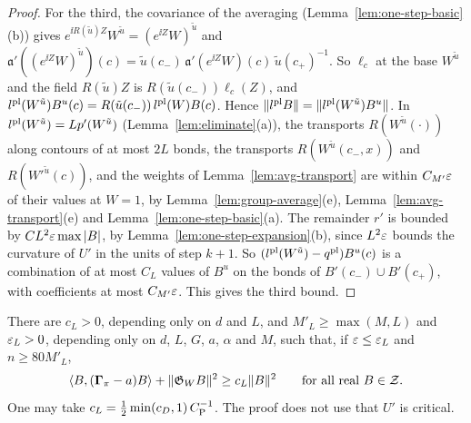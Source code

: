 \begin{proof}
For the third, the covariance of the averaging (Lemma~\ref{lem:one-step-basic}(b)) gives $e^{\ii R(\tilde u)Z}W^{\tilde u}=(e^{\ii Z}W)^{\tilde u}$ and $\mathfrak a'((e^{\ii Z}W)^{\tilde u})(c)=\tilde u(c_-)\,\mathfrak a'(e^{\ii Z}W)(c)\,\tilde u(c_+)^{-1}$. So $\ell_c$ at the base $W^{\tilde u}$ and the field $R(\tilde u)Z$ is $R(\tilde u(c_-))\ell_c(Z)$, and $l^{\rm pl}(W^{\tilde u})B^u(c)=R(\tilde u(c_-))\,l^{\rm pl}(W)B(c)$. Hence $\|l^{\rm pl}B\|=\|l^{\rm pl}(W^{\tilde u})B^u\|$. In $l^{\rm pl}(W^{\tilde u})=Lp'(W^{\tilde u})$ (Lemma~\ref{lem:eliminate}(a)), the transports $R(W^{\tilde u}(\cdot))$ along contours of at most $2L$ bonds, the transports $R(W^{\tilde u}(c_-,x))$ and $R(W'^{\tilde u}(c))$, and the weights of Lemma~\ref{lem:avg-transport} are within $C_{M'}\varepsilon$ of their values at $W=1$, by Lemma~\ref{lem:group-average}(e), Lemma~\ref{lem:avg-transport}(e) and Lemma~\ref{lem:one-step-basic}(a). The remainder $r'$ is bounded by $CL^2\varepsilon\max|B|$, by Lemma~\ref{lem:one-step-expansion}(b), since $L^2\varepsilon$ bounds the curvature of $U'$ in the units of step $k+1$. So $(l^{\rm pl}(W^{\tilde u})-q^{\rm pl})B^u(c)$ is a combination of at most $C_L$ values of $B^u$ on the bonds of $B'(c_-)\cup B'(c_+)$, with coefficients at most $C_{M'}\varepsilon$. This gives the third bound.
\end{proof}

\begin{theorem}\label{thm:step-coercive}
There are $c_L>0$, depending only on $d$ and $L$, and $M'_L\ge\max(M,L)$ and $\varepsilon_L>0$, depending only on $d$, $L$, $G$, $a$, $\alpha$ and $M$, such that, if $\varepsilon\le\varepsilon_L$ and $n\ge80M'_L$,
\[
\langle B,(\boldsymbol\Gamma_\pi-a)B\rangle+\|\mathfrak G_WB\|^2\ge c_L\|B\|^2\qquad\text{for all real }B\in\mathcal Z.
\]
One may take $c_L=\frac12\min(c_D,1)\,C_{\rm P}^{-1}$. The proof does not use that $U'$ is critical.
\end{theorem}

